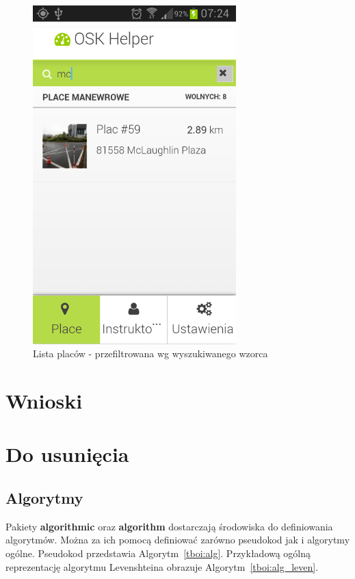 \documentclass[twoside,a4paper,openright,12pt]{book}
\begin{document}
\begin{figure}[htbp]
\centering
\includegraphics[width=0.7\textwidth]{screenshots/android/wyszukiwanie.png}
\caption{Lista placów - przefiltrowana wg wyszukiwanego wzorca}
\end{figure}


\chapter{Wnioski}


\chapter{Do usunięcia}

\section{Algorytmy}
\label{algorytmy}
Pakiety \textbf{algorithmic} oraz \textbf{algorithm} dostarczają środowiska do definiowania algorytmów. Można za ich pomocą definiować zarówno pseudokod jak i algorytmy ogólne. Pseudokod przedstawia Algorytm~\ref{tboi:alg}. Przykładową ogólną reprezentację algorytmu Levenshteina obrazuje Algorytm~\ref{tboi:alg_leven}.
\end{document}
